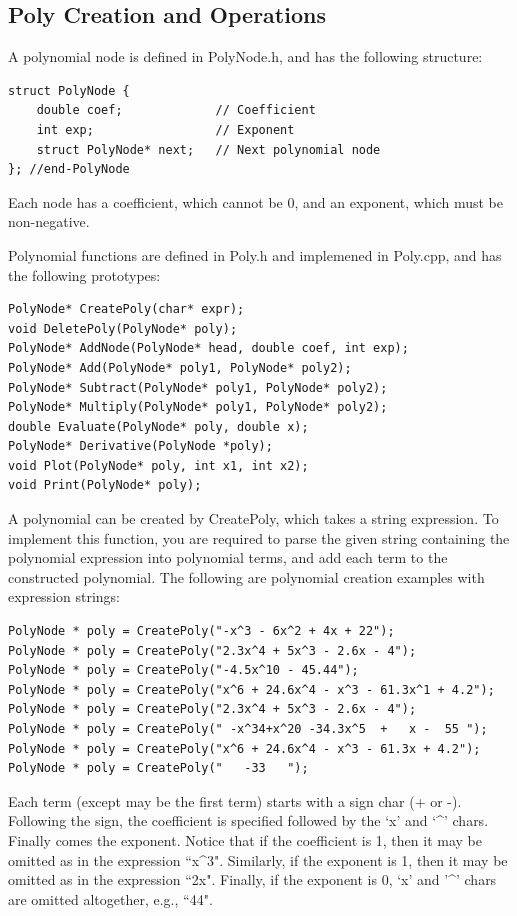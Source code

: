 \documentclass[10pt,dvipdfm]{article}
\begin{document}
\subsection{Poly Creation and Operations}
%
A polynomial node is defined in PolyNode.h, and has the following structure:
\begin{verbatim}
struct PolyNode {
	double coef;             // Coefficient
	int exp;                 // Exponent
	struct PolyNode* next;   // Next polynomial node
}; //end-PolyNode
\end{verbatim}
%
Each node has a coefficient, which cannot be 0, and an exponent, which must be non-negative.

Polynomial functions are defined in Poly.h and implemened in Poly.cpp, and has the following prototypes:

\begin{verbatim}
PolyNode* CreatePoly(char* expr);
void DeletePoly(PolyNode* poly);
PolyNode* AddNode(PolyNode* head, double coef, int exp);
PolyNode* Add(PolyNode* poly1, PolyNode* poly2);
PolyNode* Subtract(PolyNode* poly1, PolyNode* poly2);
PolyNode* Multiply(PolyNode* poly1, PolyNode* poly2);
double Evaluate(PolyNode* poly, double x);
PolyNode* Derivative(PolyNode *poly);
void Plot(PolyNode* poly, int x1, int x2);
void Print(PolyNode* poly);
\end{verbatim}
%

A polynomial can be created by CreatePoly, which takes a string expression.
To implement this function, you are required to parse the given string
containing the polynomial expression into polynomial terms, 
and add each term to the constructed polynomial. 
The following are polynomial creation examples with expression strings:

\begin{verbatim}
PolyNode * poly = CreatePoly("-x^3 - 6x^2 + 4x + 22");
PolyNode * poly = CreatePoly("2.3x^4 + 5x^3 - 2.6x - 4");
PolyNode * poly = CreatePoly("-4.5x^10 - 45.44");
PolyNode * poly = CreatePoly("x^6 + 24.6x^4 - x^3 - 61.3x^1 + 4.2");
PolyNode * poly = CreatePoly("2.3x^4 + 5x^3 - 2.6x - 4");
PolyNode * poly = CreatePoly(" -x^34+x^20 -34.3x^5  +   x -  55 ");
PolyNode * poly = CreatePoly("x^6 + 24.6x^4 - x^3 - 61.3x + 4.2");
PolyNode * poly = CreatePoly("   -33   ");
\end{verbatim}
%
Each term (except may be the first term) starts with a sign char (+ or -).
Following the sign, the coefficient is specified followed by the `x' and `\textasciicircum' chars.
Finally comes the exponent. Notice that if the coefficient is 1, then it may be omitted 
as in the expression {``x\textasciicircum 3"}.
Similarly, if the exponent is 1, then it may be omitted as in the expression ``2x". Finally, 
if the exponent is 0, `x' and '\textasciicircum' chars are omitted altogether, e.g., ``44".
\end{document}

